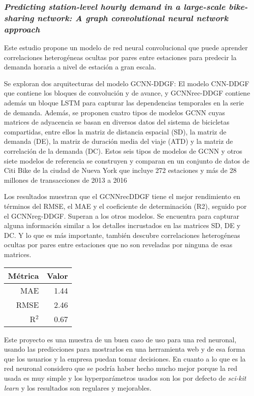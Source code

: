 \subsubsection{\textit{Predicting station-level hourly demand in a large-scale bike-sharing network: A graph convolutional neural network approach}}

Este estudio propone un modelo de red neural convolucional que puede aprender correlaciones heterogéneas ocultas por pares entre estaciones para predecir la demanda horaria a nivel de estación a gran escala.
\newline

Se exploran dos arquitecturas del modelo GCNN-DDGF: El modelo CNN-DDGF que contiene los bloques de convolución y de avance, y GCNNrec-DDGF contiene además un bloque LSTM para capturar las dependencias temporales en la serie de demanda. Además, se proponen cuatro tipos de modelos GCNN cuyas matrices de adyacencia se basan en diversos datos del sistema de bicicletas compartidas, entre ellos la matriz de distancia espacial (SD), la matriz de demanda (DE), la matriz de duración media del viaje (ATD) y la matriz de correlación de la demanda (DC). Estos seis tipos de modelos de GCNN y otros siete modelos de referencia se construyen y comparan en un conjunto de datos de Citi Bike de la ciudad de Nueva York que incluye 272 estaciones y más de 28 millones de transacciones de 2013 a 2016
\newline

Los resultados muestran que el GCNNrecDDGF tiene el mejor rendimiento en términos del RMSE, el MAE y el coeficiente de determinación (R2), seguido por el GCNNreg-DDGF. Superan a los otros modelos. Se encuentra para capturar alguna información similar a los detalles incrustados en las matrices SD, DE y DC. Y lo que es más importante, también descubre correlaciones heterogéneas ocultas por pares entre estaciones que no son reveladas por ninguna de esas matrices.

 
\begin{table}[H]
\centering
\begin{tabular}{rr}
\toprule
 Métrica & Valor \\
\midrule
 MAE &  1.44 \\
 RMSE &  2.46 \\
 R$^2$ &  0.67 \\
\bottomrule
\end{tabular}
\end{table}

Este proyecto es una muestra de un buen caso de uso para una red neuronal, usando las predicciones para mostrarlos en una herramienta web y de esa forma que los usuarios y la empresa puedan tomar decisiones. En cuanto a lo que es la red neuronal considero que se podría haber hecho mucho mejor porque la red usada es muy simple y los hyperparámetros usados son los por defecto de \textit{sci-kit learn} y los resultados son regulares y mejorables.